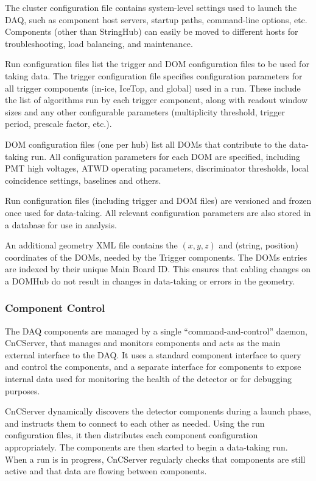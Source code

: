 The cluster configuration file contains system-level settings used to
launch the DAQ, such as component host servers, startup paths, command-line
options, etc.  Components (other than StringHub) can easily be moved to
different hosts for troubleshooting, load balancing, and maintenance.

Run configuration files list the trigger and DOM configuration files to be
used for taking data.  The trigger configuration file specifies
configuration parameters for all 
trigger components (in-ice, IceTop, and global) used in a run.  These
include the list of algorithms run by each trigger component, along with
readout window sizes and any other configurable parameters (multiplicity
threshold, trigger period, prescale factor, etc.).

DOM configuration files (one per hub) list all DOMs that contribute to
the data-taking run.  All configuration parameters for each DOM are
specified, including PMT high voltages, ATWD operating parameters,
discriminator thresholds, local coincidence settings, baselines and others.

Run configuration files (including trigger and DOM files) are versioned and
frozen once used for data-taking.  All relevant configuration parameters
are also stored in a database for use in analysis.

An additional geometry XML file contains the $(x,y,z)$ and (string,
position) coordinates of the DOMs, needed by the Trigger components.  The
DOMs entries are indexed by their unique Main Board ID.  This ensures that cabling changes
on a DOMHub do not result in changes in data-taking or errors in the geometry.

\subsubsection{Component Control}

The DAQ components are managed by a single ``command-and-control'' daemon,
CnCServer, that manages and monitors components and acts as the main
external interface to the DAQ.  It uses a standard component interface to query and
control the components, and a separate interface for components to expose
internal data used for monitoring the health of the detector or for
debugging purposes.

CnCServer dynamically discovers the detector components during a launch
phase, and instructs them to connect to each other as needed.  Using the
run configuration files, it then distributes each component configuration
appropriately.  The components are then started to begin a data-taking run.
When a run is in progress, CnCServer regularly checks that components are
still active and that data are flowing between components.

